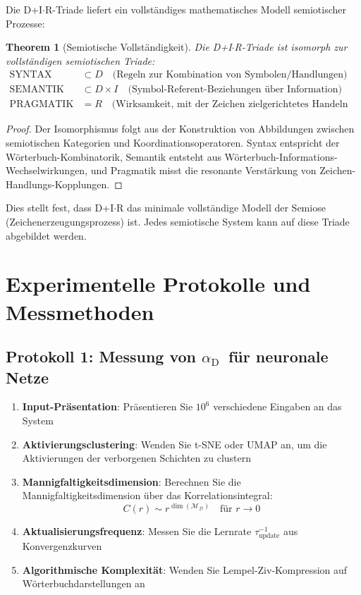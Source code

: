 \documentclass[12pt,a4paper]{article}
\newtheorem{theorem}{Theorem}
\DeclareMathOperator{\dimension}{dim}
\DeclareRobustCommand{\alD}{\texorpdfstring{\ensuremath{\alpha_{\mathrm{D}}}}{alpha_D}}
\newcommand{\Dict}{\mathcal{D}}
\newcommand{\Mdict}{\mathcal{M}_{\Dict}}
\begin{document}
	Die D+I\(\cdot\)R-Triade liefert ein vollständiges mathematisches Modell semiotischer Prozesse:
	
	\begin{theorem}[Semiotische Vollständigkeit]
		Die D+I\(\cdot\)R-Triade ist isomorph zur vollständigen semiotischen Triade:
		\begin{align*}
			\text{SYNTAX} &\subset D \quad \text{(Regeln zur Kombination von Symbolen/Handlungen)} \\
			\text{SEMANTIK} &\subset D \times I \quad \text{(Symbol-Referent-Beziehungen über Information)} \\
			\text{PRAGMATIK} &= R \quad \text{(Wirksamkeit, mit der Zeichen zielgerichtetes Handeln auslösen)}
		\end{align*}
	\end{theorem}
	
	\begin{proof}
		Der Isomorphismus folgt aus der Konstruktion von Abbildungen zwischen semiotischen Kategorien und Koordinationsoperatoren. Syntax entspricht der Wörterbuch-Kombinatorik, Semantik entsteht aus Wörterbuch-Informations-Wechselwirkungen, und Pragmatik misst die resonante Verstärkung von Zeichen-Handlungs-Kopplungen.
	\end{proof}
	
	Dies stellt fest, dass D+I\(\cdot\)R das minimale vollständige Modell der Semiose (Zeichenerzeugungsprozess) ist. Jedes semiotische System kann auf diese Triade abgebildet werden.
	
	\section{Experimentelle Protokolle und Messmethoden}
	
	\subsection{Protokoll 1: Messung von \alD\ für neuronale Netze}
	\label{subsec:protocol-alpha}
	
	\begin{enumerate}
		\item \textbf{Input-Präsentation}: Präsentieren Sie \(10^6\) verschiedene Eingaben an das System
		\item \textbf{Aktivierungsclustering}: Wenden Sie t-SNE oder UMAP an, um die Aktivierungen der verborgenen Schichten zu clustern
		\item \textbf{Mannigfaltigkeitsdimension}: Berechnen Sie die Mannigfaltigkeitsdimension über das Korrelationsintegral:
		\[
		C(r) \sim r^{\dimension(\Mdict)} \quad \text{für } r \to 0
		\]
		\item \textbf{Aktualisierungsfrequenz}: Messen Sie die Lernrate \(\tau_{\mathrm{update}}^{-1}\) aus Konvergenzkurven
		\item \textbf{Algorithmische Komplexität}: Wenden Sie Lempel-Ziv-Kompression auf Wörterbuchdarstellungen an
	\end{enumerate}
	
\end{document}

